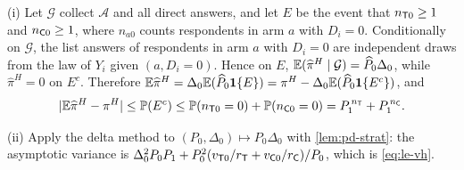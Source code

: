 (i) Let $\mathcal G$ collect $\mathcal A$ and all direct answers, and let $E$ be the event that $n_{\mathsf{T}0}\ge1$ and $n_{\mathsf{C}0}\ge1$, where $n_{a0}$ counts respondents in arm $a$ with $D_i=0$. Conditionally on $\mathcal G$, the list answers of respondents in arm $a$ with $D_i=0$ are independent draws from the law of $Y_i$ given $(a,D_i=0)$. Hence on $E$, $\mathbb{E}(\widehat\pi^H\mid\mathcal G)=\widehat P_0\Delta_0$, while $\widehat\pi^H=0$ on $E^c$. Therefore $\mathbb{E}\widehat\pi^H=\Delta_0\mathbb{E}(\widehat P_0\mathbf{1}\!\left\{E\right\})=\pi^H-\Delta_0\mathbb{E}(\widehat P_0\mathbf{1}\!\left\{E^c\right\})$, and
\[
  |\mathbb{E}\widehat\pi^H-\pi^H|\le\mathbb{P}(E^c)\le\mathbb{P}(n_{\mathsf{T}0}=0)+\mathbb{P}(n_{\mathsf{C}0}=0)=P_1^{\,n_{\mathsf{T}}}+P_1^{\,n_{\mathsf{C}}}.
\]

(ii) Apply the delta method to $(P_0,\Delta_0)\mapsto P_0\Delta_0$ with \cref{lem:pd-strat}: the asymptotic variance is $\Delta_0^2P_0P_1+P_0^2(v_{\mathsf{T}0}/r_{\mathsf{T}}+v_{\mathsf{C}0}/r_{\mathsf{C}})/P_0$, which is \eqref{eq:le-vh}.

